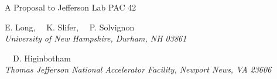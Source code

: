 \begin{center}
A Proposal to Jefferson Lab PAC 42

\vspace{1.5cm}

\setcounter{footnote}{\SPOKES}
%
{E. Long,\setcounter{footnote}{\SPOKES}
\setcounter{footnote}{\SPOKES}\footnotemark {}
\setcounter{footnote}{\CONTACT}\footnotemark{}
~~K. Slifer,\setcounter{footnote}{\SPOKES}\footnotemark
~~P. Solvignon\setcounter{footnote}{\SPOKES}\footnotemark}\\
\ls
{\normalsize\it{University of New Hampshire, Durham, NH 03861}}

\vspace{10px}

{~~D. Higinbotham\setcounter{footnote}{\SPOKES}\footnotemark}\\
\ls
{\normalsize\it{Thomas Jefferson National Accelerator Facility, Newport News, VA 23606}}
\ks
%

\end{center}


\setcounter{footnote}{0}
